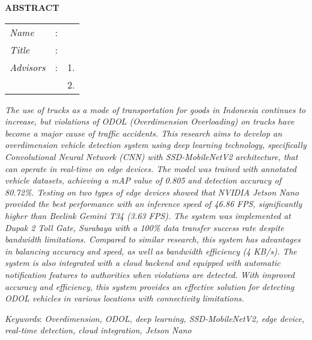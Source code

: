 \begin{center}
  \large\textbf{ABSTRACT}
\end{center}


\vspace{2ex}

\begingroup
\setlength{\tabcolsep}{0pt}

\noindent
\begin{tabularx}{\textwidth}{l >{\centering}m{3em} X}
  \emph{Name}     & : & \name{}         \\

  \emph{Title}    & : & \engtatitle{}   \\

  \emph{Advisors} & : & 1. \advisor{}   \\
                  &   & 2. \coadvisor{} \\
\end{tabularx}
\endgroup

\emph{The use of trucks as a mode of transportation for goods in Indonesia continues to increase, but violations of ODOL (Overdimension Overloading) on trucks have become a major cause of traffic accidents. This research aims to develop an overdimension vehicle detection system using deep learning technology, specifically Convolutional Neural Network (CNN) with SSD-MobileNetV2 architecture, that can operate in real-time on edge devices. The model was trained with annotated vehicle datasets, achieving a mAP value of 0.805 and detection accuracy of 80.72\%. Testing on two types of edge devices showed that NVIDIA Jetson Nano provided the best performance with an inference speed of 46.86 FPS, significantly higher than Beelink Gemini T34 (3.63 FPS). The system was implemented at Dupak 2 Toll Gate, Surabaya with a 100\% data transfer success rate despite bandwidth limitations. Compared to similar research, this system has advantages in balancing accuracy and speed, as well as bandwidth efficiency (4 KB/s). The system is also integrated with a cloud backend and equipped with automatic notification features to authorities when violations are detected. With improved accuracy and efficiency, this system provides an effective solution for detecting ODOL vehicles in various locations with connectivity limitations.}

\emph{Keywords}: \emph{Overdimension, ODOL, deep learning, SSD-MobileNetV2, edge device, real-time detection, cloud integration, Jetson Nano}

